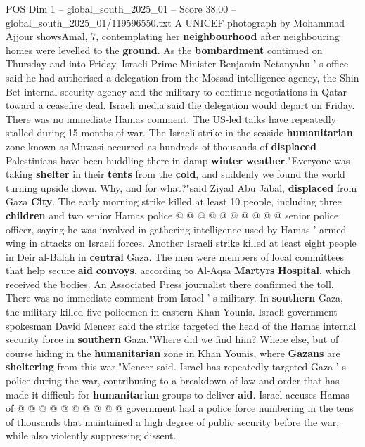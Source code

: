 \begin{textsample}{POS Dim 1 – global\_south\_2025\_01 – Score 38.00 – global\_south\_2025\_01/119596550.txt}  \label{ex:f1_pos_291}
A UNICEF photograph by Mohammad Ajjour showsAmal, 7, contemplating her \textbf{neighbourhood} after neighbouring homes were levelled to the \textbf{ground}.
As the \textbf{bombardment} continued on Thursday and into Friday, Israeli Prime Minister Benjamin Netanyahu ' s office said he had authorised a delegation from the Mossad intelligence agency, the Shin Bet internal security agency and the military to continue negotiations in Qatar toward a ceasefire deal.
Israeli media said the delegation would depart on Friday.
There was no immediate Hamas comment.
The US-led talks have repeatedly stalled during 15 months of war.
The Israeli strike in the seaside \textbf{humanitarian} zone known as Muwasi occurred as hundreds of thousands of \textbf{displaced} Palestinians have been huddling there in damp \textbf{winter} \textbf{weather}."Everyone was taking \textbf{shelter} in their \textbf{tents} from the \textbf{cold}, and suddenly we found the world turning upside down.
Why, and for what?"said Ziyad Abu Jabal, \textbf{displaced} from Gaza \textbf{City}.
The early morning strike killed at least 10 people, including three \textbf{children} and two senior Hamas police @ @ @ @ @ @ @ @ @ @ senior police officer, saying he was involved in gathering intelligence used by Hamas ' armed wing in attacks on Israeli forces.
Another Israeli strike killed at least eight people in Deir al-Balah in \textbf{central} Gaza.
The men were members of local committees that help secure \textbf{aid} \textbf{convoys}, according to Al-Aqsa \textbf{Martyrs} \textbf{Hospital}, which received the bodies.
An Associated Press journalist there confirmed the toll.
There was no immediate comment from Israel ' s military.
In \textbf{southern} Gaza, the military killed five policemen in eastern Khan Younis.
Israeli government spokesman David Mencer said the strike targeted the head of the Hamas internal security force in \textbf{southern} Gaza."Where did we find him?
Where else, but of course hiding in the \textbf{humanitarian} zone in Khan Younis, where \textbf{Gazans} are \textbf{sheltering} from this war,"Mencer said.
Israel has repeatedly targeted Gaza ' s police during the war, contributing to a breakdown of law and order that has made it difficult for \textbf{humanitarian} groups to deliver \textbf{aid}.
Israel accuses Hamas of @ @ @ @ @ @ @ @ @ @ government had a police force numbering in the tens of thousands that maintained a high degree of public security before the war, while also violently suppressing dissent.

\end{textsample}

